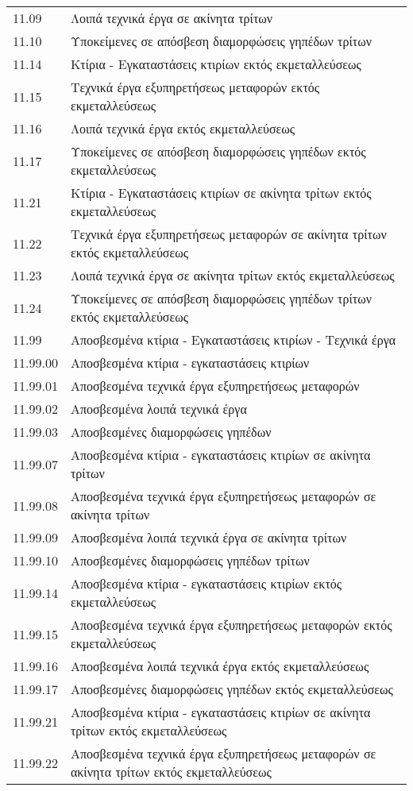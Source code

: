 \documentclass[A4,10pt,greek]{book}
\begin{document}
\begin{tabularx}{\linewidth}{lX}
11.09 & Λοιπά τεχνικά έργα σε ακίνητα τρίτων\\
11.10 & Υποκείμενες σε απόσβεση διαμορφώσεις γηπέδων τρίτων\\
11.14 & Κτίρια - Εγκαταστάσεις κτιρίων εκτός εκμεταλλεύσεως\\
11.15 & Τεχνικά έργα εξυπηρετήσεως μεταφορών εκτός εκμεταλλεύσεως\\
11.16 & Λοιπά τεχνικά έργα εκτός εκμεταλλεύσεως\\
11.17 & Υποκείμενες σε απόσβεση διαμορφώσεις γηπέδων εκτός εκμεταλλεύσεως\\
11.21 & Κτίρια - Εγκαταστάσεις κτιρίων σε ακίνητα τρίτων εκτός εκμεταλλεύσεως\\
11.22 & Τεχνικά έργα εξυπηρετήσεως μεταφορών σε ακίνητα τρίτων εκτός εκμεταλλεύσεως\\
11.23 & Λοιπά τεχνικά έργα σε ακίνητα τρίτων εκτός εκμεταλλεύσεως\\
11.24 & Υποκείμενες σε απόσβεση διαμορφώσεις γηπέδων τρίτων εκτός εκμεταλλεύσεως\\
11.99 & Αποσβεσμένα κτίρια - Εγκαταστάσεις κτιρίων - Τεχνικά έργα\\
11.99.00 & Αποσβεσμένα κτίρια - εγκαταστάσεις κτιρίων\\
11.99.01 & Αποσβεσμένα τεχνικά έργα εξυπηρετήσεως μεταφορών\\
11.99.02 & Αποσβεσμένα λοιπά τεχνικά έργα\\
11.99.03 & Αποσβεσμένες διαμορφώσεις γηπέδων\\
11.99.07 & Αποσβεσμένα κτίρια - εγκαταστάσεις κτιρίων σε ακίνητα τρίτων\\
11.99.08 & Αποσβεσμένα τεχνικά έργα εξυπηρετήσεως μεταφορών σε ακίνητα τρίτων\\
11.99.09 & Αποσβεσμένα λοιπά τεχνικά έργα σε ακίνητα τρίτων\\
11.99.10 & Αποσβεσμένες διαμορφώσεις γηπέδων τρίτων\\
11.99.14 & Αποσβεσμένα κτίρια - εγκαταστάσεις κτιρίων εκτός εκμεταλλεύσεως\\
11.99.15 & Αποσβεσμένα τεχνικά έργα εξυπηρετήσεως μεταφορών εκτός εκμεταλλεύσεως\\
11.99.16 & Αποσβεσμένα λοιπά τεχνικά έργα εκτός εκμεταλλεύσεως\\
11.99.17 & Αποσβεσμένες διαμορφώσεις γηπέδων εκτός εκμεταλλεύσεως\\
11.99.21 & Αποσβεσμένα κτίρια - εγκαταστάσεις κτιρίων σε ακίνητα τρίτων εκτός εκμεταλλεύσεως\\
11.99.22 & Αποσβεσμένα τεχνικά έργα εξυπηρετήσεως μεταφορών σε ακίνητα τρίτων εκτός εκμεταλλεύσεως\\

\end{tabularx}
\end{document}
